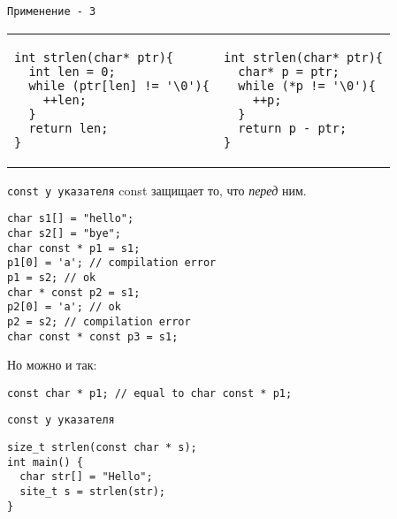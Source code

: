 \documentclass[pdf, 10pt, unicode]{beamer}
\begin{document}
\begin{frame}[fragile]{{\tt Применение - 3}}
\begin{tabular}{ll}
\begin{lstlisting}
int strlen(char* ptr){
  int len = 0;
  while (ptr[len] != '\0'){
    ++len;
  }
  return len;
}
\end{lstlisting}
&
\begin{lstlisting}
int strlen(char* ptr){
  char* p = ptr;
  while (*p != '\0'){
    ++p;
  }
  return p - ptr;
}
\end{lstlisting}
\end{tabular}

\begin{enumerate}
\end{enumerate}

\end{frame}

\begin{frame}[fragile]{{\tt const у указателя}}
const защищает то, что \emph{перед} ним.
\begin{verbatim}
char s1[] = "hello";
char s2[] = "bye";
char const * p1 = s1;
p1[0] = 'a'; // compilation error
p1 = s2; // ok
char * const p2 = s1;
p2[0] = 'a'; // ok
p2 = s2; // compilation error
char const * const p3 = s1;
\end{verbatim}
Но можно и так:
\begin{verbatim}
const char * p1; // equal to char const * p1;
\end{verbatim}
\end{frame}


\begin{frame}[fragile]{{\tt const у указателя}}
\begin{verbatim}
size_t strlen(const char * s);
int main() {
  char str[] = "Hello";
  site_t s = strlen(str);
}
\end{verbatim}
\begin{enumerate}
\end{enumerate}
\end{frame}
\end{document}
